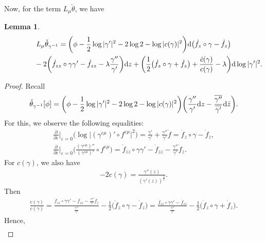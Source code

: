 \documentclass[10pt,a4paper]{amsart}
\numberwithin{equation}{section}
\newtheorem{Lemma}[Theorem]{Lemma}
\newcommand{\ov}{\overline}
\newcommand{\vep}{\varepsilon}
\begin{document}
Now, for the term $L_{\mu}\check{\theta}$, we have

\begin{Lemma}\label{l:l4}
\begin{gather*}%
L_{\mu}\check{\theta}_{\gamma^{-1}}
=\bigg(\phi-\frac{1}{2}\log|\gamma'|^2-2\log2-\log|c(\gamma)|^2\bigg){\rm d}
\big(\dot{f}_z\circ\gamma-\dot{f}_z\big)
\\ \hphantom{L_{\mu}\check{\theta}_{\gamma^{-1}}=}
{}-2\bigg(\dot{f}_{zz}\circ\gamma\gamma'-\dot{f}_{zz}-\lambda\frac{\gamma''}{\gamma'} \bigg){\rm d}z
+\bigg( \frac{1}{2}\big(\dot{f}_z\circ\gamma+\dot{f}_z\big)+\frac{\dot{c}(\gamma)}{c(\gamma)}-\lambda \bigg){\rm d}\log|\gamma'|^2.
\end{gather*}
\end{Lemma}

\begin{proof}
Recall
\begin{gather*} %
\check{\theta}_{\gamma^{-1}}[\phi]
= \bigg(\phi-\frac{1}{2}\log|\gamma'|^2-2\log2-\log|c(\gamma)|^2 \bigg)
 \bigg(\frac{\gamma''}{\gamma'} {\rm d}z -\frac{\ov{\gamma''}}{\ov{\gamma'}}{\rm d}\bar{z}\bigg).
\end{gather*}
For this, we observe the following equalities:
\begin{gather*}
\frac{\partial}{\partial\vep}\bigg|_{\vep=0}\big(\log\big|(\gamma^{\vep\mu})'\circ f^{\vep\mu}\big|^2 \big)= \frac{\dot{\gamma}'}{\gamma'}+\frac{\gamma''}{\gamma'}\dot{f} = \dot{f}_z\circ \gamma -\dot{f}_z,
\\[.5ex]
\frac{\partial}{\partial\vep}\bigg|_{\vep=0}
\bigg(\frac{(\gamma^{\vep\mu})''}{(\gamma^{\vep\mu})'}\circ f^{\vep\mu} \bigg)
=\dot{f}_{zz}\circ \gamma \gamma' -\dot{f}_{zz} -\frac{\gamma''}{\gamma'}\dot{f}_z.
\end{gather*}
For $c(\gamma)$, we also have
\begin{gather*}%
-2c(\gamma)=\frac{\gamma''(z)}{(\gamma'(z))^{\frac{3}{2}}}.
\end{gather*}
Then
\begin{gather}
\frac{\dot{c}(\gamma)}{c(\gamma)}=\frac{\dot{f}_{zz}\circ\gamma\gamma'-\dot{f}_{zz}
-\frac{\gamma''}{\gamma'}\dot{f}_z}{\frac{\gamma''}{\gamma'}}-\frac{1}{2}
\big(\dot{f}_z\circ\gamma-\dot{f}_z\big)
=\frac{\dot{f}_{zz}\circ\gamma\gamma'-\dot{f}_{zz}}{\frac{\gamma''}{\gamma'}}-\frac{1}{2}
\big(\dot{f}_z\circ\gamma+\dot{f}_z\big).\label{e:cc}
\end{gather}
Hence,
\begin{gather*}

\end{gather*}
\end{proof}
\end{document}
